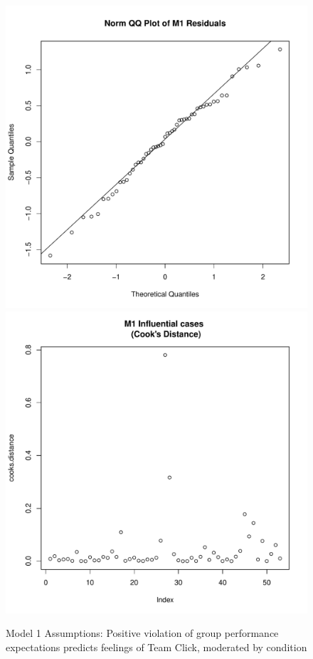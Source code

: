 \begin{figure}[htbp]
    \includegraphics[scale =.4]{images/TEM1QQNorm.pdf}
    \includegraphics[scale =.4]{images/TEM1CooksD.pdf}
    \caption{Model 1 Assumptions: Positive violation of group performance expectations predicts feelings of Team Click, moderated by condition}
    \label{fig:M1Assumptions}
\end{figure}

